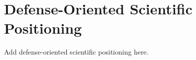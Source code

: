 \chapter{Defense-Oriented Scientific Positioning}

Add defense-oriented scientific positioning here.
